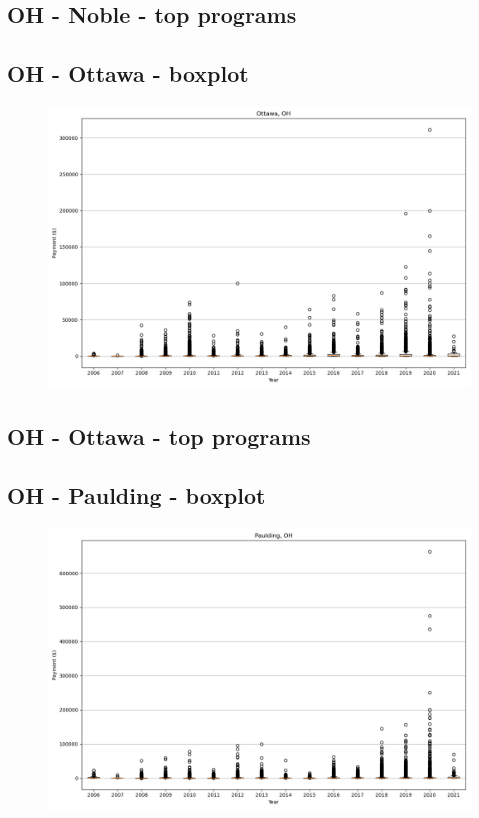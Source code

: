 \subsection*{OH - Noble - top programs}

\newpage
\subsection*{OH - Ottawa - boxplot}
\begin{figure}[h]
\centering
\includegraphics[width=7in]{../output/boxplots/counties/Ottawa-OH_boxplot.png}
\end{figure}


\subsection*{OH - Ottawa - top programs}

\newpage
\subsection*{OH - Paulding - boxplot}
\begin{figure}[h]
\centering
\includegraphics[width=7in]{../output/boxplots/counties/Paulding-OH_boxplot.png}
\end{figure}


